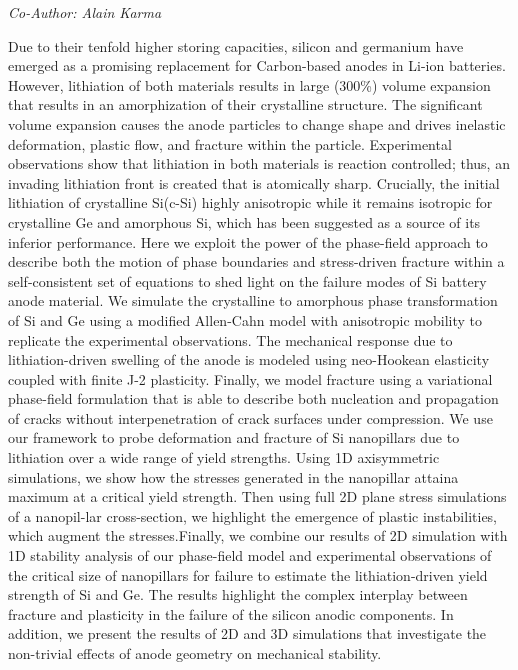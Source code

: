 \begin{center}
\textit{Co-Author: Alain Karma}
\end{center} 
Due to their tenfold higher storing capacities, silicon and germanium have emerged as a promising replacement for Carbon-based anodes in Li-ion batteries. However, lithiation of both materials results in large (300\%) volume expansion that results in an amorphization of their crystalline structure. The significant volume expansion causes the anode particles to change shape and drives inelastic deformation, plastic flow, and fracture within the particle. Experimental observations show that lithiation in both materials is reaction controlled; thus, an invading lithiation front is created that is atomically sharp. Crucially, the initial lithiation of crystalline Si(c-Si) highly anisotropic while it remains isotropic for crystalline Ge and amorphous Si, which has been suggested as a source of its inferior performance. Here we exploit the power of the phase-field approach to describe both the motion of phase boundaries and stress-driven fracture within a self-consistent set of equations to shed light on the failure modes of Si battery anode material. We simulate the crystalline to amorphous phase transformation of Si and Ge using a modified Allen-Cahn model with anisotropic mobility to replicate the experimental observations. The mechanical response due to lithiation-driven swelling of the anode is modeled using neo-Hookean elasticity coupled with finite J-2 plasticity. Finally, we model fracture using a variational phase-field formulation that is able to describe both nucleation and propagation of cracks without interpenetration of crack surfaces under compression. We use our framework to probe deformation and fracture of Si nanopillars due to lithiation over a wide range of yield strengths. Using 1D axisymmetric simulations, we show how the stresses generated in the nanopillar attaina maximum at a critical yield strength. Then using full 2D plane stress simulations of a nanopil-lar cross-section, we highlight the emergence of plastic instabilities, which augment the stresses.Finally, we combine our results of 2D simulation with 1D stability analysis of our phase-field model and experimental observations of the critical size of nanopillars for failure to estimate the lithiation-driven yield strength of Si and Ge. The results highlight the complex interplay between fracture and plasticity in the failure of the silicon anodic components. In addition, we present the results of 2D and 3D simulations that investigate the non-trivial effects of anode geometry on mechanical stability.

